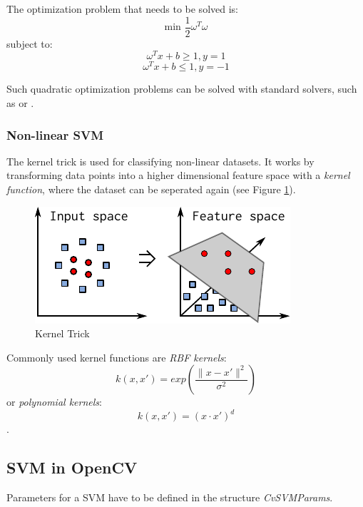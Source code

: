 The optimization problem that needs to be solved is:
$$\mbox{min } \frac{1}{2}\omega^T \omega$$
subject to:
$$\omega^T x + b \geq 1, y = 1$$
$$\omega^T x + b \leq 1, y = -1 $$

Such quadratic optimization problems can be solved with standard solvers, such as  or .

\subsubsection{Non-linear SVM}
The kernel trick is used for classifying non-linear datasets. It works by transforming data points into a higher dimensional feature space with a \textit{kernel function}, where the dataset can be seperated again (see Figure \ref{fig:kernel_trick}).


\begin{figure}[ht!]
\begin{center}
 \includegraphics[scale=1.3]{img/svm/input_space2.pdf}
 \caption{Kernel Trick}
 \label{fig:kernel_trick}
\end{center}
\end{figure}


Commonly used kernel functions are \textit{RBF kernels}:
$$k(x,x') = exp(\frac{\|x-x'\|^2}{\sigma^2})$$ 
or \textit{polynomial kernels}:
$$k(x,x') = (x \cdot x')^d$$.



\subsection{SVM in OpenCV}
Parameters for a SVM have to be defined in the structure \textit{CvSVMParams}.

